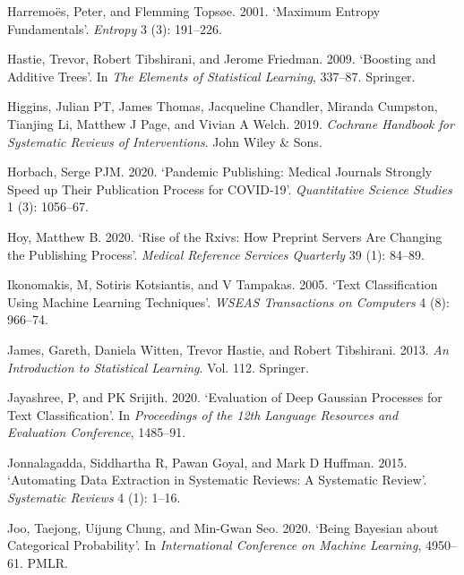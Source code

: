 \documentclass{article}
\newlength{\cslhangindent}
\newlength{\cslentryspacingunit} %
\newenvironment{CSLReferences}[2] %
 {%
  \setlength{\parindent}{0pt}
  \ifodd #1
  \let\oldpar\par
  \def\par{\hangindent=\cslhangindent\oldpar}
  \fi
  \setlength{\parskip}{#2\cslentryspacingunit}
 }%
 {}
\begin{document}
\begin{CSLReferences}{1}{0}
\leavevmode{}%
Harremoës, Peter, and Flemming Topsøe. 2001. {`Maximum Entropy
Fundamentals'}. \emph{Entropy} 3 (3): 191--226.

\leavevmode{}%
Hastie, Trevor, Robert Tibshirani, and Jerome Friedman. 2009. {`Boosting
and Additive Trees'}. In \emph{The Elements of Statistical Learning},
337--87. Springer.

\leavevmode{}%
Higgins, Julian PT, James Thomas, Jacqueline Chandler, Miranda Cumpston,
Tianjing Li, Matthew J Page, and Vivian A Welch. 2019. \emph{Cochrane
Handbook for Systematic Reviews of Interventions}. John Wiley \& Sons.

\leavevmode{}%
Horbach, Serge PJM. 2020. {`Pandemic Publishing: Medical Journals
Strongly Speed up Their Publication Process for COVID-19'}.
\emph{Quantitative Science Studies} 1 (3): 1056--67.

\leavevmode{}%
Hoy, Matthew B. 2020. {`Rise of the Rxivs: How Preprint Servers Are
Changing the Publishing Process'}. \emph{Medical Reference Services
Quarterly} 39 (1): 84--89.

\leavevmode{}%
Ikonomakis, M, Sotiris Kotsiantis, and V Tampakas. 2005. {`Text
Classification Using Machine Learning Techniques'}. \emph{WSEAS
Transactions on Computers} 4 (8): 966--74.

\leavevmode{}%
James, Gareth, Daniela Witten, Trevor Hastie, and Robert Tibshirani.
2013. \emph{An Introduction to Statistical Learning}. Vol. 112.
Springer.

\leavevmode{}%
Jayashree, P, and PK Srijith. 2020. {`Evaluation of Deep Gaussian
Processes for Text Classification'}. In \emph{Proceedings of the 12th
Language Resources and Evaluation Conference}, 1485--91.

\leavevmode{}%
Jonnalagadda, Siddhartha R, Pawan Goyal, and Mark D Huffman. 2015.
{`Automating Data Extraction in Systematic Reviews: A Systematic
Review'}. \emph{Systematic Reviews} 4 (1): 1--16.

\leavevmode{}%
Joo, Taejong, Uijung Chung, and Min-Gwan Seo. 2020. {`Being Bayesian
about Categorical Probability'}. In \emph{International Conference on
Machine Learning}, 4950--61. PMLR.


\end{CSLReferences}
\end{document}
